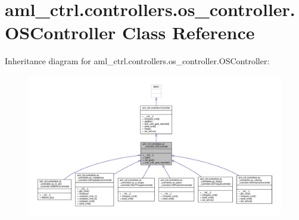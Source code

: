 \hypertarget{classaml__ctrl_1_1controllers_1_1os__controller_1_1_o_s_controller}{\section{aml\-\_\-ctrl.\-controllers.\-os\-\_\-controller.\-O\-S\-Controller Class Reference}
\label{classaml__ctrl_1_1controllers_1_1os__controller_1_1_o_s_controller}
}


Inheritance diagram for aml\-\_\-ctrl.\-controllers.\-os\-\_\-controller.\-O\-S\-Controller\-:\nopagebreak
\begin{figure}[H]
\begin{center}
\leavevmode
\includegraphics[width=350pt]{classaml__ctrl_1_1controllers_1_1os__controller_1_1_o_s_controller__inherit__graph}
\end{center}
\end{figure}


